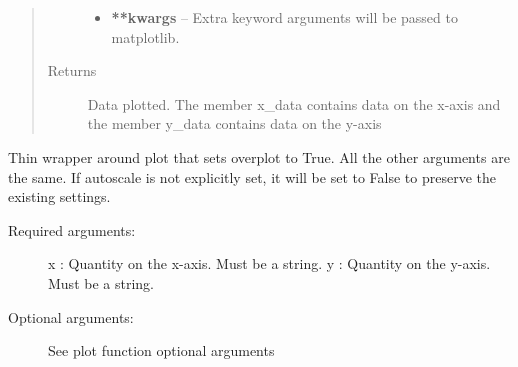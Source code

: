 \documentclass[letterpaper,10pt,english]{sphinxmanual}
\begin{document}
\begin{fulllineitems}
\begin{quote}
\begin{description}
\begin{itemize}
\item {} 
\textbf{**kwargs} --
Extra keyword arguments will be passed to matplotlib.

\end{itemize}

\item[{Returns}] \leavevmode
Data plotted. The member x\_data contains data on the x-axis and the member y\_data
contains data on the y-axis

\end{description}\end{quote}

\end{fulllineitems}


\begin{fulllineitems}
\label{index:facade.addplot}
Thin wrapper around plot that sets overplot to True.  All the other
arguments are the same. If autoscale is not explicitly set, it will be set
to False to preserve the existing settings.
\begin{description}
\item[{Required arguments:}] \leavevmode
x          : Quantity on the x-axis. Must be a string.
y          : Quantity on the y-axis. Must be a string.

\item[{Optional arguments:}] \leavevmode
See plot function optional arguments

\end{description}

\end{fulllineitems}

\end{document}
